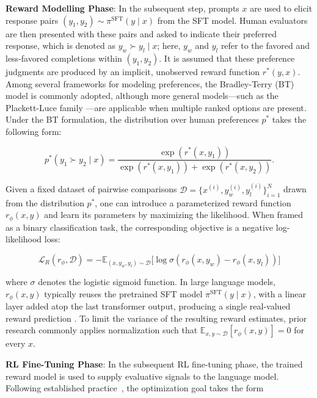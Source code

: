 \textbf{Reward Modelling Phase}: In the subsequent step, prompts $x$ are used to elicit response pairs $(y_1, y_2)\sim \pi^\text{SFT}(y \mid x)$ from the SFT model. Human evaluators are then presented with these pairs and asked to indicate their preferred response, which is denoted as $y_w\succ y_l \mid x$; here, $y_w$ and $y_l$ refer to the favored and less-favored completions within $(y_1, y_2)$. It is assumed that these preference judgments are produced by an implicit, unobserved reward function $r^*(y, x)$. Among several frameworks for modeling preferences, the Bradley-Terry (BT) model \cite{bradley1952rankanalysis} is commonly adopted, although more general models—such as the Plackett-Luce family \citep{plackett1975analysis, luce2012individual}—are applicable when multiple ranked options are present. Under the BT formulation, the distribution over human preferences $p^*$ takes the following form:

\begin{equation}\label{eq:bradley-terry}
    p^*(y_1\succ y_2 \mid x)=\frac{\exp\left(r^*(x, y_1)\right)}{\exp\left(r^*(x, y_1)\right) + \exp\left(r^*(x, y_2)\right)}.
\end{equation}

Given a fixed dataset of pairwise comparisons $\mathcal{D}=\bigl\{x^{(i)}, y_w^{(i)}, y_l^{(i)}\bigr\}_{i=1}^N$ drawn from the distribution $p^*$, one can introduce a parameterized reward function $r_{\phi}(x, y)$ and learn its parameters by maximizing the likelihood. When framed as a binary classification task, the corresponding objective is a negative log-likelihood loss:

\begin{equation}\label{eq:reward_model}
    \mathcal{L}_R(r_{\phi}, \mathcal{D}) = -\mathbb{E}_{(x, y_w, y_l)\sim \mathcal{D}}\bigl[\log \sigma(r_{\phi}(x, y_w)- r_{\phi}(x, y_l))\bigr]
\end{equation}

where $\sigma$ denotes the logistic sigmoid function. In large language models, $r_{\phi}(x, y)$ typically reuses the pretrained SFT model $\pi^\text{SFT}(y \mid x)$, with a linear layer added atop the last transformer output, producing a single real-valued reward prediction \cite{ziegler2020finetuning}. To limit the variance of the resulting reward estimates, prior research commonly applies normalization such that $\mathbb{E}_{x,y\sim \mathcal{D}}\left[r_\phi(x, y)\right] = 0$ for every $x$.

\textbf{RL Fine-Tuning Phase}: In the subsequent RL fine-tuning phase, the trained reward model is used to supply evaluative signals to the language model. Following established practice~\citep{jaques2017sequence, jaques2020human}, the optimization goal takes the form

